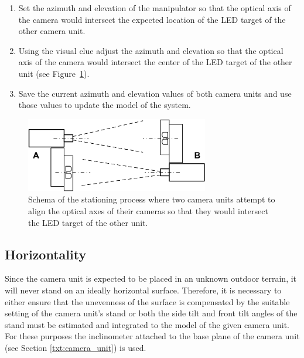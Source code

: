 \begin{enumerate}
	\item Set the azimuth and elevation of the manipulator so that the optical axis of the camera would intersect the expected location of the LED target of the other camera unit.
	\item Using the visual clue adjust the azimuth and elevation so that the optical axis of the camera would intersect the center of the LED target of the other unit (see Figure~\ref{fig:stationing_aiming}).
	\item Save the current azimuth and elevation values of both camera units and use those values to update the model of the system.
\end{enumerate}

\begin{figure}[htb]
	\centering
	\includegraphics[width=8cm]{fig/stationing_aiming.png}
	\caption{Schema of the stationing process where two camera units attempt to align the optical axes of their cameras so that they would intersect the LED target of the other unit.}
	\label{fig:stationing_aiming}
\end{figure}


\subsection{Horizontality}
Since the camera unit is expected to be placed in an unknown outdoor terrain, it will never stand on an ideally horizontal surface. Therefore, it is necessary to either ensure that the unevenness of the surface is compensated by the suitable setting of the camera unit's stand or both the side tilt and front tilt angles of the stand must be estimated and integrated to the model of the given camera unit. For these purposes the inclinometer attached to the base plane of the camera unit (see Section \ref{txt:camera_unit}) is used.


